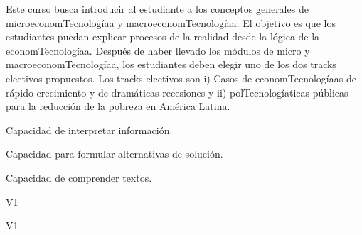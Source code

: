 \begin{syllabus}


\begin{justification}
Este curso busca introducir al estudiante a los conceptos generales de microeconomTecnologíaa y macroeconomTecnologíaa. El objetivo es que los estudiantes puedan explicar procesos de la realidad desde la lógica de la economTecnologíaa. Después de haber llevado los módulos de micro y macroeconomTecnologíaa, los estudiantes deben elegir uno de los dos tracks electivos propuestos.
Los tracks electivos son i) Casos de economTecnologíaas de rápido crecimiento y de dramáticas recesiones y ii) polTecnologíaticas públicas para la reducción de la pobreza en América Latina.
\end{justification}

\begin{goals}
\item Capacidad de interpretar información.
\item Capacidad para formular alternativas de solución.
\item Capacidad de comprender textos.
\end{goals}

\begin{outcomes}{V1}
    \item {} %
    \item {} %
    \item {} %
    \item {} %

\end{outcomes}

\begin{competences}{V1}
    \item {}
    \item {}
    \item {}
    \item {}
\end{competences}


\end{syllabus}
